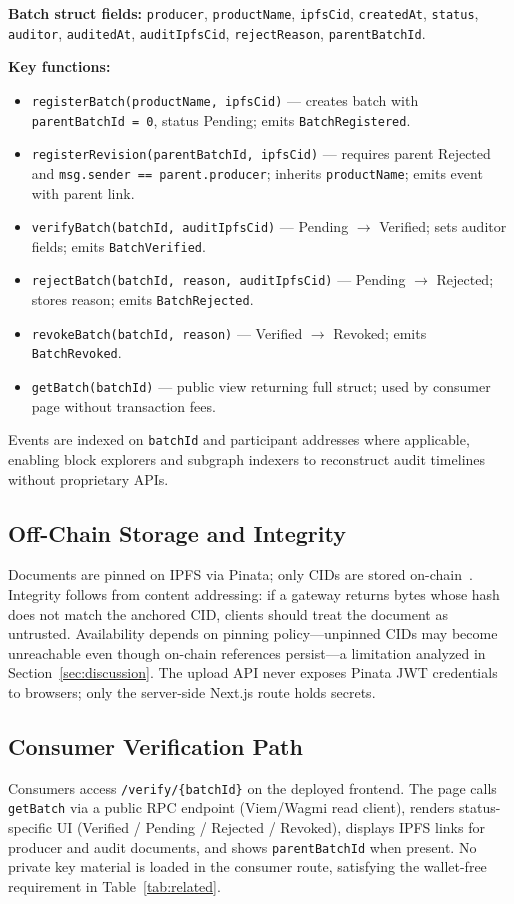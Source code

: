 \textbf{Batch struct fields:}
\texttt{producer}, \texttt{productName}, \texttt{ipfsCid}, \texttt{createdAt}, \texttt{status}, \texttt{auditor}, \texttt{auditedAt}, \texttt{auditIpfsCid}, \texttt{rejectReason}, \texttt{parentBatchId}.

\textbf{Key functions:}
\begin{itemize}
  \item \texttt{registerBatch(productName, ipfsCid)} --- creates batch with \texttt{parentBatchId = 0}, status Pending; emits \texttt{BatchRegistered}.
  \item \texttt{registerRevision(parentBatchId, ipfsCid)} --- requires parent Rejected and \texttt{msg.sender == parent.producer}; inherits \texttt{productName}; emits event with parent link.
  \item \texttt{verifyBatch(batchId, auditIpfsCid)} --- Pending $\rightarrow$ Verified; sets auditor fields; emits \texttt{BatchVerified}.
  \item \texttt{rejectBatch(batchId, reason, auditIpfsCid)} --- Pending $\rightarrow$ Rejected; stores reason; emits \texttt{BatchRejected}.
  \item \texttt{revokeBatch(batchId, reason)} --- Verified $\rightarrow$ Revoked; emits \texttt{BatchRevoked}.
  \item \texttt{getBatch(batchId)} --- public view returning full struct; used by consumer page without transaction fees.
\end{itemize}

Events are indexed on \texttt{batchId} and participant addresses where applicable, enabling block explorers and subgraph indexers to reconstruct audit timelines without proprietary APIs.

\subsection{Off-Chain Storage and Integrity}
Documents are pinned on IPFS via Pinata; only CIDs are stored on-chain~\cite{benet2014ipfs,christidis2016blockchain}.
Integrity follows from content addressing: if a gateway returns bytes whose hash does not match the anchored CID, clients should treat the document as untrusted.
Availability depends on pinning policy---unpinned CIDs may become unreachable even though on-chain references persist---a limitation analyzed in Section~\ref{sec:discussion}.
The upload API never exposes Pinata JWT credentials to browsers; only the server-side Next.js route holds secrets.

\subsection{Consumer Verification Path}
Consumers access \texttt{/verify/\{batchId\}} on the deployed frontend.
The page calls \texttt{getBatch} via a public RPC endpoint (Viem/Wagmi read client), renders status-specific UI (Verified / Pending / Rejected / Revoked), displays IPFS links for producer and audit documents, and shows \texttt{parentBatchId} when present.
No private key material is loaded in the consumer route, satisfying the wallet-free requirement in Table~\ref{tab:related}.
